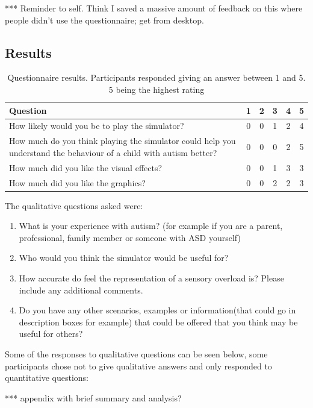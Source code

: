 \documentclass[11pt]{report}
\begin{document}
*** Reminder to self. Think I saved a massive amount of feedback on this where people didn't use the questionnaire; get from desktop.

\subsection{Results}

\begin{table}[H]
\caption{Questionnaire results. Participants responded giving an answer between 1 and 5. 5 being the highest rating}
\begin{tabular}{| p{9cm} | c c c c c |}
\hline
\textbf{Question} & 1 & 2 & 3 & 4 & 5 \\
\hline
How likely would you be to play the simulator? & 0 & 0 & 1 & 2 & 4 \\
\hline
How much do you think playing the simulator could help you understand the behaviour of a child with autism better? & 0 & 0 & 0 & 2 & 5 \\
\hline
How much did you like the visual effects? & 0 & 0 & 1 & 3 & 3 \\
\hline
How much did you like the graphics? & 0 & 0 & 2 & 2 & 3 \\ 
\hline
\end{tabular}
\end{table}

The qualitative questions asked were:
\begin{enumerate}
\item What is your experience with autism? (for example if you are a parent, professional, family member or someone with ASD yourself)
\item Who would you think the simulator would be useful for?
\item How accurate do feel the representation of a sensory overload is? Please include any additional comments.
\item Do you have any other scenarios, examples or information(that could go in description boxes for example) that could be offered that you think may be useful for others?
\end{enumerate}

Some of the responses to qualitative questions can be seen below, some participants chose not to give qualitative answers and only responded to quantitative questions:

*** appendix with brief summary and analysis?
\end{document}
